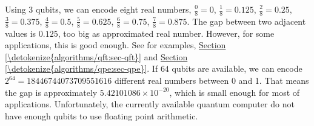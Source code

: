 \documentclass[letterpaper,10pt,english]{jupyterBook}
\begin{document}
\sphinxAtStartPar
Using 3 qubits, we can encode eight real numbers,
\(\frac{0}{8} = 0\), \(\frac{1}{8} = 0.125\), \(\frac{2}{8} = 0.25\), \(\frac{3}{8} = 0.375\),
\(\frac{4}{8} = 0.5\), \(\frac{5}{8}=0.625\), \(\frac{6}{8}=0.75\), \(\frac{7}{8}= 0.875\). The gap between two adjacent values is \(0.125\), too big as approximated real number.  However, for some applications, this is good enough. See for examples, \hyperref[\detokenize{algorithms/qft:sec-qft}]{Section \ref{\detokenize{algorithms/qft:sec-qft}}} and \hyperref[\detokenize{algorithms/qpe:sec-qpe}]{Section \ref{\detokenize{algorithms/qpe:sec-qpe}}}. If \(64\) qubits are available, we can encode \(2^{64} = 18446744073709551616\) different real numbers between 0 and 1.  That means the gap is approximately \(5.42101086 \times 10^{-20}\), which is small enough for most of applications.  Unfortunately, the currently available quantum computer do not have enough qubits to use floating point arithmetic.
\end{document}
